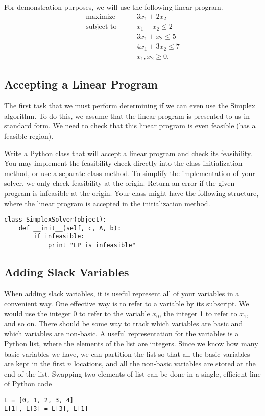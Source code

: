 For demonstration purposes, we will use the following linear program.
\begin{align*}
\text{maximize}\qquad & 3x_1 + 2x_2 \\
\text{subject to}\qquad 
& x_1 - x_2 \leq 2 \\
& 3x_1 + x_2 \leq 5 \\
& 4x_1 + 3x_2 \leq 7 \\
& x_1, x_2 \geq 0.
\end{align*}

\subsection{Accepting a Linear Program}
The first task that we must perform determining if we can even use the Simplex algorithm.
To do this, we assume that the linear program is presented to us in standard form.
We need to check that this linear program is even feasible (has a feasible region).

\begin{problem}
Write a Python class that will accept a linear program and check its feasibility.
You may implement the feasibility check directly into the class initialization method, or use a separate class method.
To simplify the implementation of your solver, we only check feasibility at the origin.
Return an error if the given program is infeasible at the origin.
Your class might have the following structure, where the linear program is accepted in the initialization method.
\begin{lstlisting}
class SimplexSolver(object):
    def __init__(self, c, A, b):
        if infeasible:
            print "LP is infeasible"
\end{lstlisting}
\label{prob:initsolver}
\end{problem}

\subsection{Adding Slack Variables}
When adding slack variables, it is useful represent all of your variables in a convenient way.
One effective way is to refer to a variable by its subscript.  
We would use the integer 0 to refer to the variable $x_0$, the integer 1 to refer to $x_1$, and so on.
There should be some way to track which variables are basic and which variables are non-basic.
A useful representation for the variables is a Python list, where the elements of the list are integers.
Since we know how many basic variables we have, we can partition the list so that all the basic variables are kept in the first $n$ locations, and all the non-basic variables are stored at the end of the list.
Swapping two elements of list can be done in a single, efficient line of Python code
\begin{lstlisting}
L = [0, 1, 2, 3, 4]
L[1], L[3] = L[3], L[1]
\end{lstlisting}

